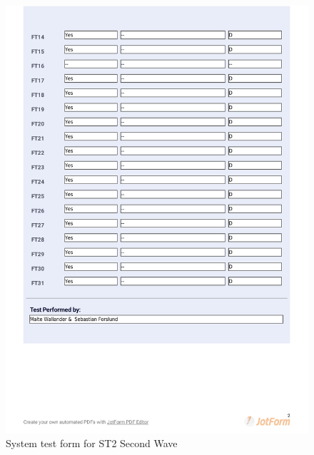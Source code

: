 \documentclass{article}
\begin{document}
 \begin{figure}
     \centering
     \includegraphics[trim={0cm 15cm 0cm 0cm}, clip,width=13cm]{images/2021-03-08_Malte_ST2-2}
     \renewcommand\figurename{Figure}
     \caption{System test form for ST2 Second Wave}
     \label{fig:my_label}
 \end{figure}
\end{document}
